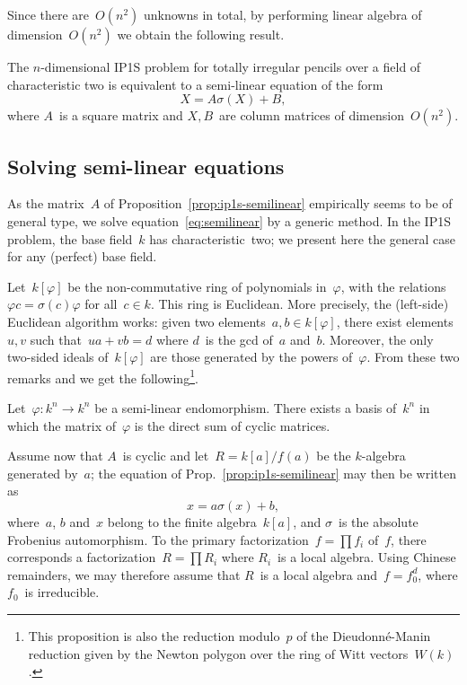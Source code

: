 \documentclass{amsart}
\begin{document}
Since there are~$O(n^2)$ unknowns in total,
by performing linear algebra of dimension~$O(n^2)$
we obtain the following result.

\begin{prop}\label{prop:ip1s-semilinear}
The $n$-dimensional IP1S problem for totally irregular pencils
over a field of characteristic two is equivalent to
a semi-linear equation of the form
\begin{equation}\label{eq:semilinear}
X = A σ(X) + B,
\end{equation}
where $A$~is a square matrix and $X, B$~are column matrices of
dimension~$O(n^2)$.
\end{prop}

\subsection{Solving semi-linear equations}

As the matrix~$A$ of Proposition~\ref{prop:ip1s-semilinear}
empirically seems to be of general type,
we solve equation~\eqref{eq:semilinear} by a generic method.
In the IP1S problem, the base field~$k$ has characteristic~two; we
present here the general case for any (perfect) base field.

Let~$k[φ]$ be the non-commutative ring of polynomials in~$φ$,
with the relations~$φ c = σ(c) φ$ for all~$c ∈ k$. This ring is Euclidean.
More precisely, the (left-side) Euclidean algorithm works:
given two elements~$a, b ∈ k[φ]$, there exist elements~$u, v$
such that~$u a + v b = d$ where $d$~is the gcd of~$a$ and~$b$.
Moreover, the only two-sided ideals of~$k[φ]$
are those generated by the powers of~$φ$.
From these two remarks and \cite[Ch.~3, Th.~19]{jacobson1943rings} we get
the following\footnote{%
This proposition is also the reduction modulo~$p$ of
the Dieudonné-Manin reduction given by the Newton polygon
over the ring of Witt vectors~$W(k)$.}.
\begin{prop}
Let~$φ: k^n → k^n$ be a semi-linear endomorphism. There exists a basis
of~$k^n$ in which the matrix of~$φ$ is the direct sum of cyclic matrices.
\end{prop}

Assume now that $A$~is cyclic and let~$R = k[a]/f(a)$ be the $k$-algebra
generated by~$a$; the equation of Prop.~\eqref{prop:ip1s-semilinear} may
then be written as
\begin{equation}\label{eq:semi-linear-pol}
x = a σ(x) + b,
\end{equation}
where~$a$, $b$ and~$x$ belong to the finite algebra~$k[a]$, and $σ$~is
the absolute Frobenius automorphism. To the primary factorization~$f = ∏
f_i$ of~$f$, there corresponds a factorization~$R = ∏ R_i$ where $R_i$~is
a local algebra. Using Chinese remainders, we may therefore assume that
$R$~is a local algebra and~$f = f_0^d$, where $f_0$~is irreducible.
\end{document}

